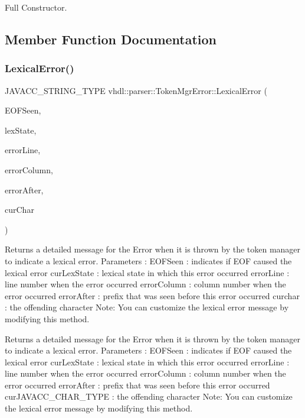 Full Constructor. 

\subsection{Member Function Documentation}
\mbox{\label{classvhdl_1_1parser_1_1_token_mgr_error_af7c34fbde6a8739dd51565cc3b378530}} 
\subsubsection{\texorpdfstring{LexicalError()}{LexicalError()}}
{\footnotesize\ttfamily J\+A\+V\+A\+C\+C\+\_\+\+S\+T\+R\+I\+N\+G\+\_\+\+T\+Y\+PE vhdl\+::parser\+::\+Token\+Mgr\+Error\+::\+Lexical\+Error (\begin{DoxyParamCaption}\item[{bool}]{E\+O\+F\+Seen,  }\item[{int}]{lex\+State,  }\item[{int}]{error\+Line,  }\item[{int}]{error\+Column,  }\item[{J\+A\+V\+A\+C\+C\+\_\+\+S\+T\+R\+I\+N\+G\+\_\+\+T\+Y\+PE}]{error\+After,  }\item[{J\+A\+V\+A\+C\+C\+\_\+\+C\+H\+A\+R\+\_\+\+T\+Y\+PE}]{cur\+Char }\end{DoxyParamCaption})}

Returns a detailed message for the Error when it is thrown by the token manager to indicate a lexical error. Parameters \+: E\+O\+F\+Seen \+: indicates if E\+OF caused the lexical error cur\+Lex\+State \+: lexical state in which this error occurred error\+Line \+: line number when the error occurred error\+Column \+: column number when the error occurred error\+After \+: prefix that was seen before this error occurred curchar \+: the offending character Note\+: You can customize the lexical error message by modifying this method.

Returns a detailed message for the Error when it is thrown by the token manager to indicate a lexical error. Parameters \+: E\+O\+F\+Seen \+: indicates if E\+OF caused the lexical error cur\+Lex\+State \+: lexical state in which this error occurred error\+Line \+: line number when the error occurred error\+Column \+: column number when the error occurred error\+After \+: prefix that was seen before this error occurred cur\+J\+A\+V\+A\+C\+C\+\_\+\+C\+H\+A\+R\+\_\+\+T\+Y\+PE \+: the offending character Note\+: You can customize the lexical error message by modifying this method. 

